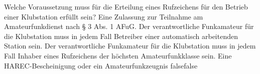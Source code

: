     {Welche Voraussetzung muss für die Erteilung eines Rufzeichens für den Betrieb einer Klubstation erfüllt sein?}
    {Eine Zulassung zur Teilnahme am Amateurfunkdienst nach § 3 Abs. 1 AFuG.}
    {Der verantwortliche Funkamateur für die Klubstation muss in jedem Fall Betreiber einer automatisch arbeitenden Station sein.}
    {Der verantwortliche Funkamateur für die Klubstation muss in jedem Fall Inhaber eines Rufzeichens der höchsten Amateurfunkklasse sein.}
    {Eine HAREC-Bescheinigung oder ein Amateurfunkzeugnis}
    {false}{false}